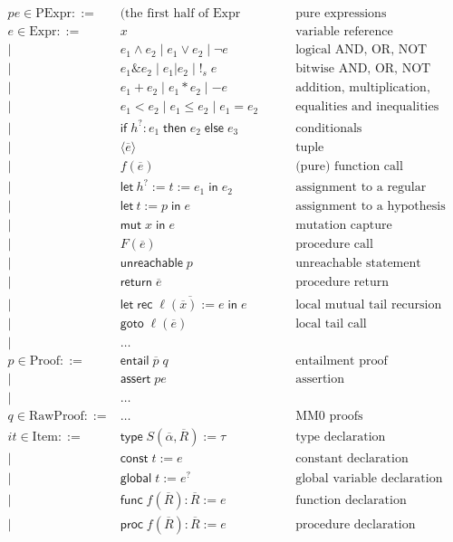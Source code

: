 \documentclass[acmsmall,nonacm]{acmart}
\begin{document}
\begin{align*}
  pe\in \mathrm{PExpr} ::={}&\mbox{(the first half of Expr below)}&&\mbox{pure expressions}\\
  e \in \mathrm{Expr} ::={}& x&&\mbox{variable reference}\\
    \mid{}&e_1 \land e_2\mid e_1 \lor e_2\mid \neg e&&\mbox{logical AND, OR, NOT}\\
    \mid{}&e_1 \mathbin\texttt{\&} e_2\mid e_1 \mathbin\texttt{|} e_2\mid \texttt{!}_s\; e&&\mbox{bitwise AND, OR, NOT}\\
    \mid{}&e_1 + e_2\mid e_1 * e_2\mid -e&&\mbox{addition, multiplication, negation}\\
    \mid{}&e_1 < e_2\mid e_1 \le e_2\mid e_1 = e_2&&\mbox{equalities and inequalities}\\
    \mid{}&\mathsf{if}\;h^? : e_1\;\mathsf{then}\;e_2\;\mathsf{else}\;e_3&&\mbox{conditionals}\\
    \mid{}&\langle\overline{e}\rangle&&\mbox{tuple}\\
    \mid{}&f(\overline{e})&&\mbox{(pure) function call}\\[2mm]
    \mid{}&\mathsf{let}\ h^? := t := e_1\;\mathsf{in}\; e_2 &&\mbox{assignment to a regular variable}\\
    \mid{}& \mathsf{let}\ t := p\;\mathsf{in}\; e&&\mbox{assignment to a hypothesis}\\
    \mid{}&\mathsf{mut}\;x\;\mathsf{in}\;e&&\mbox{mutation capture}\\
    \mid{}&F(\overline{e})&&\mbox{procedure call}\\
    \mid{}&\mathsf{unreachable}\;p&&\mbox{unreachable statement}\\
    \mid{}&\mathsf{return}\; \overline{e}&&\mbox{procedure return}\\
    \mid{}&\mathsf{let\;rec}\;\overline{\ell(\overline{x}):=e}\;\mathsf{in}\;e&&\mbox{local mutual tail recursion}\\
    \mid{}&\mathsf{goto}\;\ell(\overline{e})&&\mbox{local tail call}\\
    \mid{}&\dots\\
  p \in \mathrm{Proof} ::={}&\mathsf{entail}\;\overline{p}\;q&&\mbox{entailment proof}\\
    \mid{}&\mathsf{assert}\;pe&&\mbox{assertion}\\
    \mid{}&\dots\\
  q \in \mathrm{RawProof} ::={}&\dots&&\mbox{MM0 proofs}\\
  it \in \mathrm{Item} ::={}&\mathsf{type}\;S(\overline{\alpha}, \overline{R}):=\tau&&\mbox{type declaration}\\
    \mid{}&\mathsf{const}\;t:=e&&\mbox{constant declaration}\\
    \mid{}&\mathsf{global}\;t:=e^?&&\mbox{global variable declaration}\\
    \mid{}&\mathsf{func}\;f(\overline{R}):\overline{R}:=e&&\mbox{function declaration}\\
    \mid{}&\mathsf{proc}\;f(\overline{R}):\overline{R}:=e&&\mbox{procedure declaration}\\
\end{align*}
\end{document}
